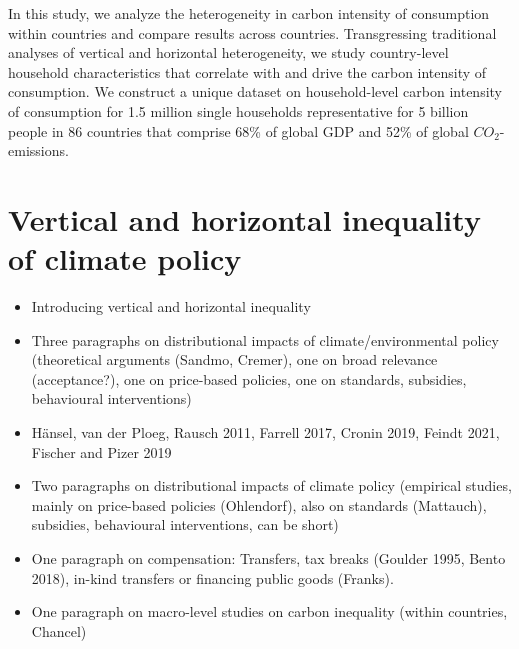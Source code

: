 \documentclass[12pt, a4paper]{article}
\begin{document}

In this study, we analyze the heterogeneity in carbon intensity of consumption within countries and compare results across countries. Transgressing traditional analyses of vertical and horizontal heterogeneity, we study country-level household characteristics that correlate with and drive the carbon intensity of consumption. We construct a unique dataset on household-level carbon intensity of consumption for 1.5 million single households representative for 5 billion people in 86 countries that comprise 68\% of global GDP and 52\% of global $CO_{2}$-emissions.






\section{Vertical and horizontal inequality of climate policy} \label{sec:literature}

\begin{itemize}
  \item Introducing vertical and horizontal inequality
  \item Three paragraphs on distributional impacts of climate/environmental policy (theoretical arguments (Sandmo, Cremer), one on broad relevance (acceptance?), one on price-based policies, one on standards, subsidies, behavioural interventions)
  \item Hänsel, van der Ploeg, Rausch 2011, Farrell 2017, Cronin 2019, Feindt 2021, Fischer and Pizer 2019 
  \item Two paragraphs on distributional impacts of climate policy (empirical studies, mainly on price-based policies (Ohlendorf), also on standards (Mattauch), subsidies, behavioural interventions, can be short)
  \item One paragraph on compensation: Transfers, tax breaks (Goulder 1995, Bento 2018), in-kind transfers or financing public goods (Franks).
  \item One paragraph on macro-level studies on carbon inequality (within countries, Chancel)

\end{itemize}
\end{document}
